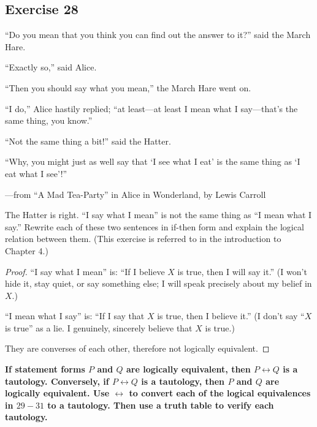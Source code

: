 \documentclass[14pt]{extarticle}
\newcommand{\bic}{\leftrightarrow}
\begin{document}
\subsection{Exercise 28}
“Do you mean that you think you can find out the answer to it?” said the March Hare.

“Exactly so,” said Alice.

“Then you should say what you mean,” the March Hare went on.

“I do,” Alice hastily replied; “at least—at least I mean what I say—that’s the same thing, you know.”

“Not the same thing a bit!” said the Hatter.

“Why, you might just as well say that ‘I see what I eat’ is the same thing as ‘I eat what I see’!”

—from “A Mad Tea-Party” in Alice in Wonderland, by Lewis Carroll

The Hatter is right. “I say what I mean” is not the same thing as “I mean what I say.” Rewrite each of these two sentences in if-then form and explain the logical relation between them. (This exercise is referred to in the introduction to Chapter 4.)

\begin{proof}
“I say what I mean” is: ``If I believe $X$ is true, then I will
say it.'' (I won't hide it, stay quiet, or say something else; I will speak precisely about my belief in $X$.)

“I mean what I say” is: ``If I say that $X$ is true, then I believe it.'' (I don't say ``$X$ is true'' as a lie. I genuinely, sincerely believe that $X$ is true.)

They are converses of each other, therefore not logically equivalent.
\end{proof}

{\bf If statement forms $P$ and $Q$ are logically equivalent, then $P \bic Q$ is a tautology. Conversely, if $P \bic Q$ is a tautology, then $P$ and $Q$ are logically equivalent. Use $\bic$ to convert each of the logical equivalences in $29-31$ to a tautology. Then use a truth table to verify each tautology.}
\end{document}
